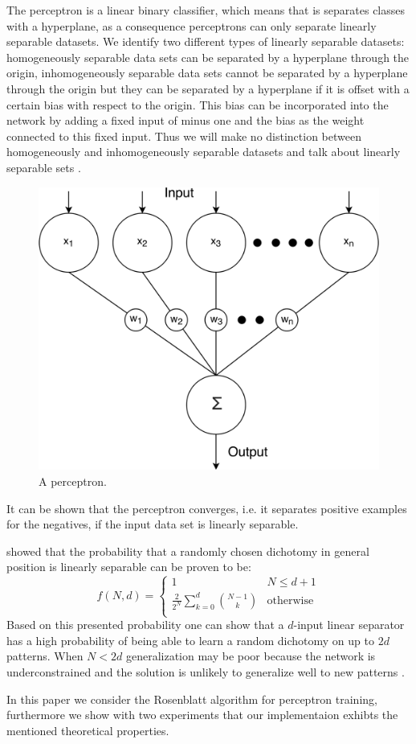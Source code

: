 The perceptron is a linear binary classifier, which means that is separates classes with a hyperplane, as a consequence perceptrons can only separate linearly separable datasets. We identify two different types of linearly separable datasets: homogeneously separable data sets can be separated by a hyperplane through the origin, inhomogeneously separable data sets cannot be separated by a hyperplane through the origin but they can be separated by a hyperplane if it is offset with a certain bias with respect to the origin. This bias can be incorporated into the network by adding a fixed input of minus one and the bias as the weight connected to this fixed input. Thus we will make no distinction between homogeneously and inhomogeneously separable datasets and talk about linearly separable sets \cite{rojas1996neural}.
\begin{figure}[H]
	\centering
	\includegraphics[width=\columnwidth]{./img/perceptron}
	\caption{A perceptron.}
	\label{fig:1:perceptron}
\end{figure}
It can be shown that the perceptron converges, i.e. it separates positive examples for the negatives, if the input data set is linearly separable.

\textcite{cover1965geometrical} showed that the probability that a randomly chosen dichotomy  in general position is linearly separable can be proven to be:
	\begin{equation}\label{eq:1:lsChance}
		f(N,d) = 
		\begin{cases}
		1
		& N \leq d + 1\\
		\frac{2}{2^N} \displaystyle\sum_{k = 0}^{d} \binom{N - 1}{k}										
		& \text{otherwise}\\
		\end{cases}
	\end{equation}
Based on this presented probability one can show that a $d$-input linear separator has a high probability of being able to learn a random dichotomy on up to $2d$ patterns. When $N < 2d$ generalization may be poor because the network is underconstrained and the solution is unlikely to generalize well to new patterns \cite{reed1998neural}. 

In this paper we consider the Rosenblatt algorithm for perceptron training, furthermore we show with two experiments that our implementaion exhibts the mentioned theoretical properties. 
